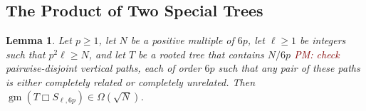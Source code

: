 \documentclass[kpfonts,lotsofwhite]{patmorin}
\newcommand{\boxprod}{\mathbin{\Box}}
\renewcommand{\ge}{\geqslant}
\renewcommand{\le}{\leqslant}
\DeclareMathOperator{\gm}{gm}
\newcommand{\pat}[1]{\textcolor{Maroon}{PM: #1}}
\theoremstyle{plain}
\newtheorem{lem}[thm]{Lemma}
\theoremstyle{definition}
\begin{document}
%
%

\subsection{The Product of Two Special Trees}


\begin{lem}\label{star_times_star}
  Let $p\ge 1$, let $N$ be a positive multiple of $6p$, let $\ell\ge 1$ be integers such that $p^2\ell \ge N$, and let $T$ be a rooted tree that contains $N/6p$ \pat{check} pairwise-disjoint vertical paths, each of order $6p$ such that any pair of these paths is either completely related or completely unrelated.  Then $\gm(T\boxprod S_{\ell,6p})\in \Omega(\sqrt{N})$.
\end{lem}
\end{document}
